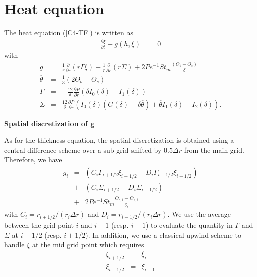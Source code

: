 \section{Heat equation}

The heat equation (\ref{C4-TF}) is written as
\begin{eqnarray}
  \frac{\partial \xi}{\partial t}-g(h,\xi)&=&0
\end{eqnarray}
with
\begin{eqnarray}
  g& =& \frac{1}{r}\frac{\partial}{\partial                          r}
        \left( r\Gamma\xi\right) +\frac{1}{r}\frac{\partial}{\partial                          r}
        \left(r\Sigma\right)+2Pe^{-1}St_m\frac{\left(\Theta_b-\Theta_s\right)}{\delta}\\
  \overline{\theta}&=&\frac{1}{3}\left(2\Theta_b+\Theta_s\right)\\
  \Gamma&=&-\frac{12}{\delta}
            \frac{\partial
            P}{\partial
            r}\left(\delta
            I_0(\delta)-I_1(\delta)\right)\\
  \Sigma &=& \frac{12}{\delta} \frac{\partial P}{\partial r}\left(I_0(\delta)\left(G(\delta)-\delta\overline{\theta}\right)+\overline{\theta}I_1(\delta)-I_2(\delta)\right).
\end{eqnarray}

\vspace{.5cm} \textbf{Spatial discretization of g} \vspace{.5cm}

As for the thickness equation,  the spatial discretization is obtained
using  a  central  difference  scheme   over  a  sub-grid  shifted  by
$0.5\Delta r$ from the main grid. Therefore, we have
\begin{eqnarray}
  g_i &=& \left(C_i\Gamma_{i+1/2}\xi_{i+1/2}-D_i\Gamma_{i-1/2}\xi_{i-1/2}\right)\\
      &+&\left(C_i\Sigma_{i+1/2}-D_i\Sigma_{i-1/2}\right)\\
      &+&2Pe^{-1}St_m\frac{\Theta_{b,i}-\Theta_{s,i}}{\delta_i}
\end{eqnarray}
with         $C_i         =r_{i+1/2}/(r_i\Delta        r)$         and
$D_i =r_{i-1/2}/(r_i\Delta r)$.   We use the average  between the grid
point $i$ and $i-1$ (resp. $i+1$) to evaluate the quantity in $\Gamma$
and  $\Sigma$ at  $i-1/2$ (resp.   $i+1/2$).   In addition,  we use  a
classical upwind  scheme to handle $\xi$  at the mid grid  point which
requires
\begin{eqnarray}
  \xi_{i+1/2} &=& \xi_i\\
  \xi_{i-1/2} &=& \xi_{i-1}
\end{eqnarray}

